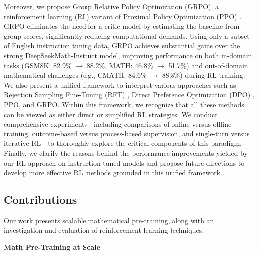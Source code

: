 Moreover, we propose Group Relative Policy Optimization (GRPO), a reinforcement learning (RL) variant of Proximal Policy Optimization (PPO) \citep{schulman2017proximal}. GRPO eliminates the need for a critic model by estimating the baseline from group scores, significantly reducing computational demands. Using only a subset of English instruction tuning data, GRPO achieves substantial gains over the strong DeepSeekMath-Instruct model, improving performance on both in-domain tasks (GSM8K: 82.9\% $\rightarrow$ 88.2\%, MATH: 46.8\% $\rightarrow$ 51.7\%) and out-of-domain mathematical challenges (e.g., CMATH: 84.6\% $\rightarrow$ 88.8\%) during RL training. We also present a unified framework to interpret various approaches such as Rejection Sampling Fine-Tuning (RFT) \citep{yuan2023scaling}, Direct Preference Optimization (DPO) \citep{dpo}, PPO, and GRPO. Within this framework, we recognize that all these methods can be viewed as either direct or simplified RL strategies. We conduct comprehensive experiments—including comparisons of online versus offline training, outcome-based versus process-based supervision, and single-turn versus iterative RL—to thoroughly explore the critical components of this paradigm. Finally, we clarify the reasons behind the performance improvements yielded by our RL approach on instruction-tuned models and propose future directions to develop more effective RL methods grounded in this unified framework.

\subsection{Contributions}
Our work presents scalable mathematical pre-training, along with an investigation and evaluation of reinforcement learning techniques.

\textbf{Math Pre-Training at Scale}

